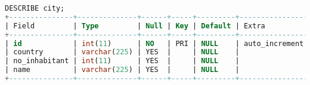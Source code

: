 \documentclass[12pt]{article}
\begin{document}
\begin{lstlisting}[language=SQL]
DESCRIBE city;
+---------------+--------------+------+-----+---------+----------------+
| Field         | Type         | Null | Key | Default | Extra          |
+---------------+--------------+------+-----+---------+----------------+
| id            | int(11)      | NO   | PRI | NULL    | auto_increment |
| country       | varchar(225) | YES  |     | NULL    |                |
| no_inhabitant | int(11)      | YES  |     | NULL    |                |
| name          | varchar(225) | YES  |     | NULL    |                |
+---------------+--------------+------+-----+---------+----------------+


\end{lstlisting}

\end{document}
